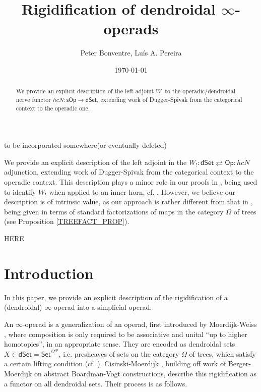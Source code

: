 \documentclass[a4paper,10pt
,draft
]{article}%
\title{Rigidification of dendroidal $\infty$-operads}
\author{Peter Bonventre, Lu\'is A. Pereira}%
\date{\today}
\numberwithin{equation}{section}
\numberwithin{figure}{section}
\theoremstyle{definition} %
\newcommand{\Set}{\ensuremath{\mathsf{Set}}}
\newcommand{\sOp}{\ensuremath{\mathsf{sOp}}}%
\newcommand{\dSet}{\mathsf{dSet}}
\newcommand{\1}{\ensuremath{\mathbbm 1}}%
\begin{document}
\maketitle

\begin{abstract}
        We provide an explicit description of the left adjoint $W_!$
        to the operadic/dendroidal nerve functor
        $hc N \colon \sOp \to \dSet$,
        extending work of Dugger-Spivak from the categorical context to the operadic one.
\end{abstract}

\tableofcontents


{\color{red} to be incorporated somewhere(or eventually deleted)}


We provide an explicit description of the left adjoint
in the 
$W_! 
\colon 
\mathsf{dSet} 
\rightleftarrows 
\mathsf{Op}
\colon 
hcN$
adjunction,
extending work of Dugger-Spivak \cite{DS11}
from the categorical context to the operadic context.
This description plays a minor role in our proofs 
in \cite[\S \ref{TAS-PFMNTHM SEC}]{BP_TAS},
being used to identify
$W_!$ when applied to an inner horn,
cf. \cite[Lemma \ref{TAS-WLEFTQPUSH LEM}]{BP_TAS}.
However, we believe our description is of intrinsic value,
as our approach is rather different from that in \cite{DS11},
being given in terms of 
standard factorizations of maps in the
category $\Omega$ of trees
(see Proposition \ref{TREEFACT_PROP}).



{\color{red} HERE}


\section{Introduction}

In this paper, we provide an explicit description of the rigidification of a (dendroidal) $\infty$-operad into a simplicial operad.

An $\infty$-operad is a generalization of an operad, first introduced by Moerdijk-Weiss \cite{MW07}, where
composition is only required to be associative and unital ``up to higher homotopies'', in an appropriate sense.
They are encoded as dendroidal sets $X \in \dSet = \Set^{\Omega^{op}}$,
i.e. presheaves of sets on the category $\Omega$ of trees,
which satisfy a certain lifting condition (cf. \cite[\S 2.1]{CM11}).
Cisinski-Moerdijk \cite[\S 4]{CM13b},
building off work of Berger-Moerdijk \cite{BM06,BM07} on abstract Boardman-Vogt constructions,
describe this rigidification as a functor on all dendroidal sets.
Their process is as follows.
\end{document}
